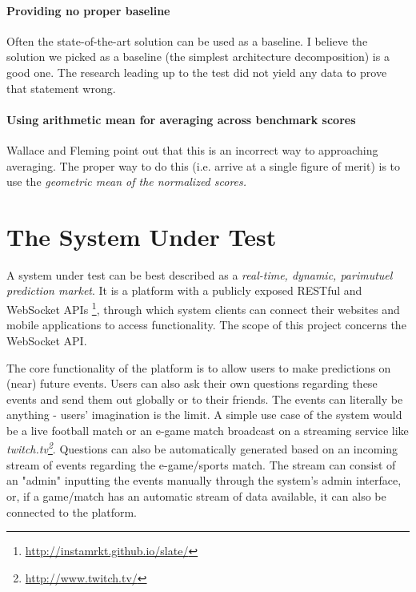 \documentclass{uvamscse}
\begin{document}
\subsubsection{Providing no proper baseline}
Often the state-of-the-art solution can be used as a baseline. I believe the solution we picked as a baseline (the simplest architecture decomposition) is a good one. The research leading up to the test did not yield any data to prove that statement wrong.

\subsubsection{Using arithmetic mean for averaging across benchmark scores}
Wallace and Fleming \cite{Fleming} point out that this is an incorrect way to approaching averaging.
The proper way to do this (i.e. arrive at a single figure of merit) is to use the \textit{geometric mean of the normalized scores.}


\chapter{The System Under Test}\label{The System Under Test}

A system under test can be best described as a \textit{real-time, dynamic, parimutuel prediction market}. It is a platform with a publicly exposed RESTful and WebSocket APIs \footnote{\url{http://instamrkt.github.io/slate/}}, through which system clients can connect their websites and mobile applications to access functionality. The scope of this project concerns the WebSocket API.

The core functionality of the platform is to allow users to make predictions on (near) future events. Users can also ask their own questions regarding these events and send them out globally or to their friends. The events can literally be anything - users' imagination is the limit. A simple use case of the system would be a live football match or an e-game match broadcast on a streaming service like \textit{twitch.tv\footnote{\url{http://www.twitch.tv/}}}. Questions can also be automatically generated based on an incoming stream of events regarding the e-game/sports match. The stream can consist of an "admin" inputting the events manually through the system's admin interface, or, if a game/match has an automatic stream of data available, it can also be connected to the platform.
\end{document}
